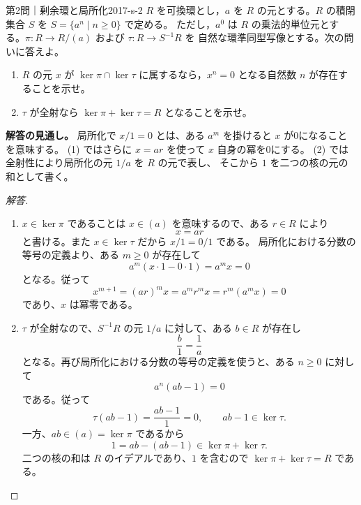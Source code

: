 \begin{problem}{第2問｜剰余環と局所化}{2017-s-2}
$R$ を可換環とし，$a$ を $R$ の元とする。$R$ の積閉集合 $S$ を $S=\{a^n\mid n\ge0\}$ で定める。
ただし，$a^0$ は $R$ の乗法的単位元とする。$\pi:R\to R/(a)$ および $\tau:R\to S^{-1}R$ を
自然な環準同型写像とする。次の問いに答えよ。
\begin{enumerate}
  \item[(1)] $R$ の元 $x$ が $\ker\pi\cap\ker\tau$ に属するなら，$x^n=0$ となる自然数 $n$ が存在することを示せ。
  \item[(2)] $\tau$ が全射なら $\ker\pi+\ker\tau=R$ となることを示せ。
\end{enumerate}
\end{problem}
\begin{memo*}
\textbf{解答の見通し。}
局所化で $x/1=0$ とは、ある $a^m$ を掛けると $x$ が0になることを意味する。
(1) ではさらに $x=ar$ を使って $x$ 自身の冪を0にする。
(2) では全射性により局所化の元 $1/a$ を $R$ の元で表し、
そこから $1$ を二つの核の元の和として書く。
\end{memo*}
\begin{proof}[解答]
\begin{enumerate}
  \item[(1)] $x\in\ker\pi$ であることは $x\in(a)$ を意味するので、ある $r\in R$ により
  \[
  x=ar
  \]
  と書ける。また $x\in\ker\tau$ だから $x/1=0/1$ である。
  局所化における分数の等号の定義より、ある $m\ge0$ が存在して
  \[
  a^m(x\cdot1-0\cdot1)=a^mx=0
  \]
  となる。従って
  \[
  x^{m+1}=(ar)^m x=a^m r^m x=r^m(a^mx)=0
  \]
  であり、$x$ は冪零である。

  \item[(2)] $\tau$ が全射なので、$S^{-1}R$ の元 $1/a$ に対して、ある $b\in R$ が存在し
  \[
  \frac b1=\frac1a
  \]
  となる。再び局所化における分数の等号の定義を使うと、ある $n\ge0$ に対して
  \[
  a^n(ab-1)=0
  \]
  である。従って
  \[
  \tau(ab-1)=\frac{ab-1}{1}=0,
  \qquad ab-1\in\ker\tau.
  \]
  一方、$ab\in(a)=\ker\pi$ であるから
  \[
  1=ab-(ab-1)\in\ker\pi+\ker\tau.
  \]
  二つの核の和は $R$ のイデアルであり、$1$ を含むので
  $\ker\pi+\ker\tau=R$ である。
\end{enumerate}
\end{proof}

